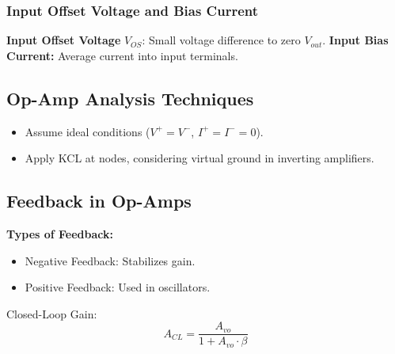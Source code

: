 \documentclass[9pt]{article}
\begin{document}
\begin{multicols*}{2}
\subsubsection{Input Offset Voltage and Bias Current}
\textbf{Input Offset Voltage} \(V_{OS}\): Small voltage difference to zero \(V_{out}\).
\textbf{Input Bias Current:} Average current into input terminals.

\subsection{Op-Amp Analysis Techniques}
\begin{itemize}
    \item Assume ideal conditions (\(V^+ = V^-\), \(I^+ = I^- = 0\)).
    \item Apply KCL at nodes, considering virtual ground in inverting amplifiers.
\end{itemize}

\subsection{Feedback in Op-Amps}
\textbf{Types of Feedback:}
\begin{itemize}\itemsep0pt
    \item Negative Feedback: Stabilizes gain.
    \item Positive Feedback: Used in oscillators.
\end{itemize}
Closed-Loop Gain:
\[
A_{CL} = \frac{A_{vo}}{1 + A_{vo} \cdot \beta}
\]

\end{multicols*}
\end{document}
